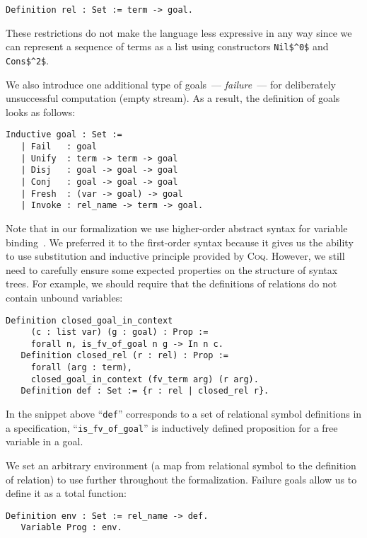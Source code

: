 \begin{lstlisting}[language=Coq,basicstyle=\footnotesize]
   Definition rel : Set := term -> goal.
\end{lstlisting}

These restrictions do not make the language less expressive in any way since we can represent a sequence of terms as a list using constructors \lstinline|Nil$^0$| and \lstinline|Cons$^2$|.

We also introduce one additional type of goals~--- \emph{failure}~--- for deliberately unsuccessful computation (empty stream). As a result, the definition of goals looks as follows:

\begin{lstlisting}[language=Coq,basicstyle=\footnotesize]
   Inductive goal : Set :=
   | Fail   : goal
   | Unify  : term -> term -> goal
   | Disj   : goal -> goal -> goal
   | Conj   : goal -> goal -> goal
   | Fresh  : (var -> goal) -> goal
   | Invoke : rel_name -> term -> goal.
\end{lstlisting}

Note that in our formalization we use higher-order abstract syntax for variable binding~\cite{HOAS}. We preferred it to the first-order syntax because it gives us the ability
to use substitution and inductive principle provided by \textsc{Coq}. However, we still need to carefully ensure some expected properties on the structure of syntax trees.
For example, we should require that the definitions of relations do not contain unbound variables:

\begin{lstlisting}[language=Coq,basicstyle=\footnotesize]
   Definition closed_goal_in_context
     (c : list var) (g : goal) : Prop :=
     forall n, is_fv_of_goal n g -> In n c.
   Definition closed_rel (r : rel) : Prop :=
     forall (arg : term),
     closed_goal_in_context (fv_term arg) (r arg). 
   Definition def : Set := {r : rel | closed_rel r}.
\end{lstlisting}

In the snippet above ``\lstinline[language=Coq]{def}'' corresponds to a set of relational symbol definitions in a specification, ``\lstinline[language=Coq]{is_fv_of_goal}''
is inductively defined proposition for a free variable in a goal.

We set an arbitrary environment (a map from relational symbol to the definition of relation) to use further throughout the formalization. Failure goals allow us to define it as
a total function:

\begin{lstlisting}[language=Coq,basicstyle=\footnotesize]
   Definition env : Set := rel_name -> def.
   Variable Prog : env.
\end{lstlisting}

